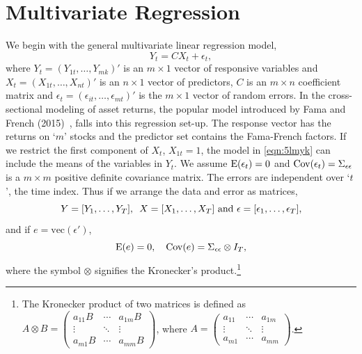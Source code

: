 \section{Multivariate Regression \label{s:s_mr}} \label{in:multreg1}

We begin with the general multivariate linear regression model,
	\begin{equation} \label{eqn:5lmyk}
	Y_t = C X_t + \epsilon_t,
	\end{equation}
where $Y_t= (Y_{1t}, \ldots,Y_{mk})'$ is an $m \times 1$ vector of responsive variables and $X_t= (X_{1t}, \ldots, X_{nt})'$ is an $n \times 1$ vector of predictors, $C$ is an $m \times n$ coefficient matrix and $\epsilon_t= (\epsilon_{it}, \ldots, \epsilon_{mt})'$ is the $m \times 1$ vector of random errors. In the cross-sectional modeling of asset returns, the popular model introduced by Fama and French (2015)~\cite{fama2015}, falls into this regression set-up. The response vector has the returns on `$m$' stocks and the predictor set contains the Fama-French factors. If we restrict the first component of $X_t$, $X_{1t}= 1$, the model in \eqref{eqn:5lmyk} can include the means of the variables in $Y_t$. We assume $\operatorname{E}(\epsilon_t)= 0$ and $\operatorname{Cov}(\epsilon_t)= \Sigma_{\epsilon \epsilon}$ is a $m \times m$ positive definite covariance matrix. The errors are independent over `$t$', the time index. Thus if we arrange the data and error as matrices,
	\begin{equation} \label{eqn:5yyt}
	Y= [Y_1,\ldots,Y_T], \enskip X=[X_1,\ldots,X_T] \text{ and } \epsilon= [\epsilon_1, \ldots,\epsilon_T],
	\end{equation}
and if $e=\text{vec}(\epsilon')$,
	\begin{equation} \label{eqn:5Ee0}
	\Ex(e)=0, \quad \cov(e)= \Sigma_{\epsilon \epsilon} \otimes I_T,
	\end{equation}
where the symbol $\otimes$ signifies the Kronecker's product.\footnote{The Kronecker product of two matrices is defined as $A \otimes B= \begin{pmatrix} a_{11} B & \cdots & a_{1m} B \\ \vdots & \ddots & \vdots \\ a_{m1} B & \cdots & a_{mm}B \end{pmatrix}$, where $A= \begin{pmatrix} a_{11} & \cdots & a_{1m} \\ \vdots & \ddots & \vdots \\ a_{m1} & \cdots & a_{mm} \end{pmatrix}$.} 


